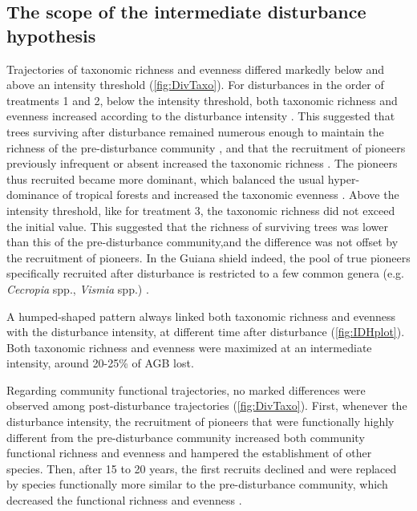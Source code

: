\documentclass[fleqn,10pt]{ArtEcoFoG} %
\begin{document}
\subsection{The scope of the intermediate disturbance
hypothesis}\label{the-scope-of-the-intermediate-disturbance-hypothesis}

Trajectories of taxonomic richness and evenness differed markedly below
and above an intensity threshold (\ref{fig:DivTaxo}). For disturbances
in the order of treatments 1 and 2, below the intensity threshold, both
taxonomic richness and evenness increased according to the disturbance
intensity \citep{Martin2015, Chaudhary2016}. This suggested that trees
surviving after disturbance remained numerous enough to maintain the
richness of the pre-disturbance community \citep{Bongers2009}, and that
the recruitment of pioneers previously infrequent or absent increased
the taxonomic richness \citep{Martin2015, Chaudhary2016}. The pioneers
thus recruited became more dominant, which balanced the usual
hyper-dominance of tropical forests and increased the taxonomic evenness
\citep{Baraloto2012a}. Above the intensity threshold, like for treatment
3, the taxonomic richness did not exceed the initial value. This
suggested that the richness of surviving trees was lower than this of
the pre-disturbance community,and the difference was not offset by the
recruitment of pioneers. In the Guiana shield indeed, the pool of true
pioneers specifically recruited after disturbance is restricted to a few
common genera (e.g. \emph{Cecropia} spp., \emph{Vismia} spp.)
\citep{Guitet2018}.

A humped-shaped pattern always linked both taxonomic richness and
evenness with the disturbance intensity, at different time after
disturbance (\ref{fig:IDHplot}). Both taxonomic richness and evenness
were maximized at an intermediate intensity, around 20-25\% of AGB lost.

Regarding community functional trajectories, no marked differences were
observed among post-disturbance trajectories (\ref{fig:DivTaxo}). First,
whenever the disturbance intensity, the recruitment of pioneers that
were functionally highly different from the pre-disturbance community
increased both community functional richness and evenness
\citep{Denslow1980, Molino2001} and hampered the establishment of other
species. Then, after 15 to 20 years, the first recruits declined and
were replaced by species functionally more similar to the
pre-disturbance community, which decreased the functional richness and
evenness \citep{Walker2009}.
\end{document}
